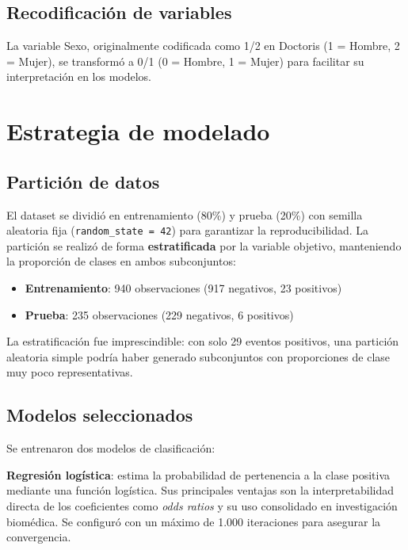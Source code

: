 \documentclass[12pt, a4paper, oneside]{report}
\begin{document}
\subsection{Recodificación de variables}

La variable Sexo, originalmente codificada como 1/2 en Doctoris (1 = Hombre, 2 = Mujer), se transformó a 0/1 (0 = Hombre, 1 = Mujer) para facilitar su interpretación en los modelos.

\section{Estrategia de modelado}

\subsection{Partición de datos}

El dataset se dividió en entrenamiento (80\%) y prueba (20\%) con semilla aleatoria fija (\texttt{random\_state = 42}) para garantizar la reproducibilidad. La partición se realizó de forma \textbf{estratificada} por la variable objetivo, manteniendo la proporción de clases en ambos subconjuntos:

\begin{itemize}
    \item \textbf{Entrenamiento}: 940 observaciones (917 negativos, 23 positivos)
    \item \textbf{Prueba}: 235 observaciones (229 negativos, 6 positivos)
\end{itemize}

La estratificación fue imprescindible: con solo 29 eventos positivos, una partición aleatoria simple podría haber generado subconjuntos con proporciones de clase muy poco representativas.

\subsection{Modelos seleccionados}

Se entrenaron dos modelos de clasificación:

\textbf{Regresión logística}: estima la probabilidad de pertenencia a la clase positiva mediante una función logística. Sus principales ventajas son la interpretabilidad directa de los coeficientes como \textit{odds ratios} y su uso consolidado en investigación biomédica. Se configuró con un máximo de 1.000 iteraciones para asegurar la convergencia.
\end{document}
